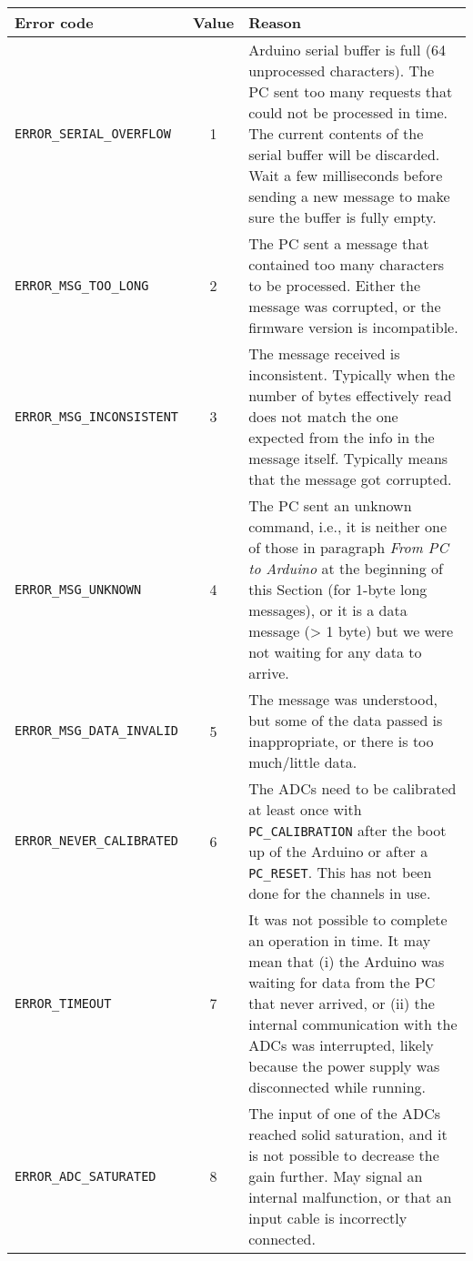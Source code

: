 \documentclass[11pt,a4paper,english]{article}
\begin{document}
\begin{itemize}
	\begin{centering}
	\begin{tabular}{lcp{}}\toprule
	Error code                          & Value & Reason\\\midrule
	\texttt{ERROR\_SERIAL\_OVERFLOW}    & 1     & Arduino serial buffer is full (64 unprocessed characters). The PC sent too many requests that could not be processed in time. The current contents of the serial buffer will be discarded. Wait a few milliseconds before sending a new message to make sure the buffer is fully empty.\\
	\texttt{ERROR\_MSG\_TOO\_LONG}      & 2     & The PC sent a message that contained too many characters to be processed. Either the message was corrupted, or the firmware version is incompatible.\\
	\texttt{ERROR\_MSG\_INCONSISTENT}    & 3     & The message received is inconsistent. Typically when the number of bytes effectively read does not match the one expected from the info in the message itself. Typically means that the message got corrupted.\\
	\texttt{ERROR\_MSG\_UNKNOWN}        & 4     & The PC sent an unknown command, i.e., it is neither one of those in paragraph \textit{From PC to Arduino} at the beginning of this Section (for 1-byte long messages), or it is a data message (> 1 byte) but we were not waiting for any data to arrive.\\
	\texttt{ERROR\_MSG\_DATA\_INVALID}  & 5     & The message was understood, but some of the data passed is inappropriate, or there is too much/little data.\\
	\texttt{ERROR\_NEVER\_CALIBRATED}   & 6     & The ADCs need to be calibrated at least once with \texttt{PC\_CALIBRATION} after the boot up of the Arduino or after a \texttt{PC\_RESET}. This has not been done for the channels in use.\\
	\texttt{ERROR\_TIMEOUT}             & 7     & It was not possible to complete an operation in time. It may mean that (i) the Arduino was waiting for data from the PC that never arrived, or (ii) the internal communication with the ADCs was interrupted, likely because the power supply was disconnected while running.\\
	\texttt{ERROR\_ADC\_SATURATED}      & 8     & The input of one of the ADCs reached solid saturation, and it is not possible to decrease the gain further. May signal an internal malfunction, or that an input cable is incorrectly connected.\\

\end{tabular}
\end{centering}
\end{itemize}
\end{document}
